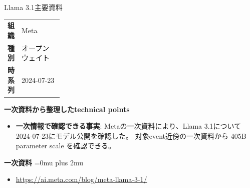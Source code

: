 \begin{technicalnote}{Llama 3.1}{主要資料}
\begingroup
\begin{tabularx}{\linewidth}{@{}>{\bfseries}p{0.22\linewidth}X@{}}
組織 & Meta \\
種別 & オープンウェイト \\
時系列 & 2024-07-23 \\
\end{tabularx}
\smallskip
{\bfseries 一次資料から整理したtechnical points}
\begin{itemize}[leftmargin=1.5em,itemsep=0.35em]
\item \textbf{一次情報で確認できる事実}: Metaの一次資料により、Llama 3.1について2024-07-23にモデル公開を確認した。 対象event近傍の一次資料から 405B parameter scale を確認できる。
\end{itemize}
\begin{minipage}{\linewidth}
\begin{samepage}
{\bfseries 一次資料}
\begingroup\sloppy
\Urlmuskip=0mu plus 2mu\relax
\begin{itemize}[leftmargin=1.5em,itemsep=0.25em]
\item {\scriptsize\url{https://ai.meta.com/blog/meta-llama-3-1/}}
\end{itemize}
\endgroup
\end{samepage}
\end{minipage}
\endgroup
\end{technicalnote}
\medskip

